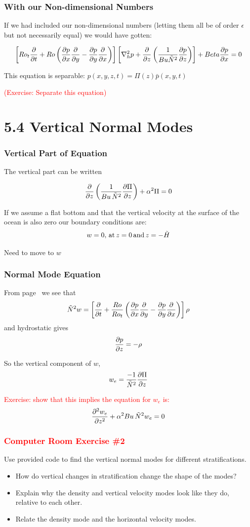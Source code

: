 \documentclass[xcolor=dvipsnames]{beamer}
\begin{document}
\begin{frame}
\frametitle{With our Non-dimensional Numbers}

If we had included our non-dimensional numbers (letting them all be of order $\epsilon$ but not necessarily equal) we would have gotten:

\[
\left[ Ro_t \frac {\partial}{\partial t} + Ro \left(\frac {\partial p}{\partial x} \frac {\partial}{\partial y} - \frac {\partial p}{\partial y} \frac {\partial}{\partial x}\right)\right] \left[ \nabla_h^2 p + \frac {\partial}{\partial z} \left( \frac {1}{Bu \tilde N^2} \frac {\partial p}{\partial z} \right)\right] + Beta \frac {\partial p}{\partial x} =0\]

This equation is separable: $p(x,y,z,t) = \Pi(z) \bar p(x,y,t)$

\textcolor{red}{(Exercise: Separate this equation)}


\end{frame}

\section{5.4 Vertical Normal Modes}

\begin{frame}
\frametitle{Vertical Part of Equation}
The vertical part can be written 

\[ \frac {\partial}{\partial z} \left( \frac{1}{Bu \, \tilde N^2} \frac {\partial \Pi}{\partial z} \right)+ \alpha^2 \Pi = 0 \]

If we assume a flat bottom and that the vertical velocity at the surface of the ocean is also zero our boundary conditions are:
\[ w = 0, \, {\rm at}\, z=0\,{\rm and}\, z=-\tilde H\]

Need to move to $w$
\end{frame}

\begin{frame}
\frametitle{Normal Mode Equation}

From page~\pageref{density_eqn} we see that
\[\tilde N^2 w = \left[ \frac {\partial}{\partial t} + \frac{Ro}{Ro_t} \left(\frac {\partial p}{\partial x} \frac {\partial}{\partial y} - \frac {\partial p}{\partial y} \frac {\partial}{\partial x}\right)\right] \rho\]
and hydrostatic gives
\[\frac {\partial p}{\partial z} = -\rho\]

So the vertical component of $w$, 
\[ w_e = \frac{-1}{\tilde N^2} \frac{\partial\Pi}{\partial z}\]

\textcolor{red}{Exercise: show that this implies the equation for $w_e$ is:
\[\frac{\partial^2 w_e}{\partial z^2} + \alpha^2 Bu\, \tilde N^2 w_e = 0\]}
\end{frame}



\begin{frame}
\frametitle{\textcolor{red}{Computer Room Exercise \#2}}

Use provided code to find the vertical normal modes for different stratifications.
\begin{itemize}
\item How do vertical changes in stratification change the shape of the modes?
\item Explain why the density and vertical velocity modes look like they do, relative to each other.
\item Relate the density mode and the horizontal velocity modes.
\end{itemize}

\end{frame}
\end{document}
